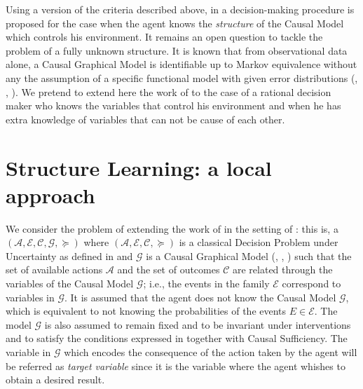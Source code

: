 \documentclass[letterpaper]{article}
\begin{document}
Using a version of the criteria described above, in \cite{gonzalez2018playing} a decision-making procedure is proposed for the case when the agent knows the \textit{structure} of the Causal Model which controls his environment. It remains an open question to tackle the problem of a fully unknown structure. It is known that from observational data alone, a Causal Graphical Model is identifiable up to Markov equivalence without any the assumption of a specific functional model with given error distributions (\cite{hauser2012characterization}, \cite{hauser2012two}, \cite{peters2011identifiability}). We pretend to extend here the work of \cite{gonzalez2018playing} to the case of a rational decision maker who knows the variables that control his environment and when he has extra knowledge of variables that can not be cause of each other. 

\section{Structure Learning: a local approach}
We consider the problem of extending the work of \cite{gonzalez2018playing} in the setting of \cite{2019arXiv190202279G}: this is, a $(\mathcal{A}, \mathcal{E}, \mathcal{C}, \mathcal{G}, \succeq)$ where $(\mathcal{A}, \mathcal{E}, \mathcal{C}, \succeq)$ is a classical Decision Problem under Uncertainty as defined in \cite{bernardo2000bayesian} and $\mathcal{G}$ is a Causal Graphical Model (\cite{spirtes2000causation}, \cite{koller2009probabilistic}, \cite{sucar2015probabilistic}) such that the set of available actions $\mathcal{A}$ and the set of outcomes $\mathcal{C}$ are related through the variables of the Causal Model $\mathcal{G}$; i.e., the events in the family $\mathcal{E}$ correspond to variables in $\mathcal{G}$. It is assumed that the agent does not know the Causal Model $\mathcal{G}$, which is equivalent to not knowing the probabilities of the events $E \in \mathcal{E}$. The model $\mathcal{G}$ is also assumed to remain fixed and to be invariant under interventions \cite{woodward2005making} and to satisfy the conditions expressed in \cite{spirtes2000causation} together with Causal Sufficiency. The variable in $\mathcal{G}$ which encodes the consequence of the action taken by the agent will be referred as \textit{target variable} since it is the variable where the agent whishes to obtain a desired result. 
\end{document}
